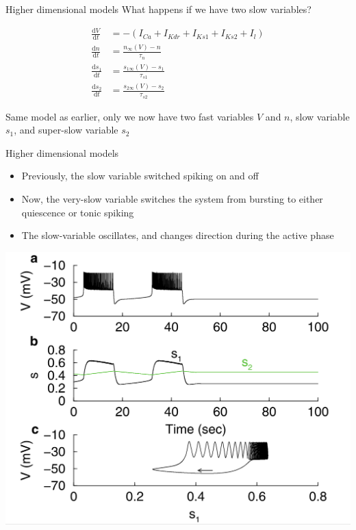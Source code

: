 \documentclass[presentation]{beamer}
\begin{document}
\begin{frame}[label={sec:org3cc1abf}]{Higher dimensional models}
What happens if we have two slow variables?

\begin{align}
\frac{\mathrm{d}V}{\mathrm{d}t} &= -(I_{Ca} + I_{Kdr} + I_{Ks1} + I_{Ks2} + I_l) \\ \nonumber
\frac{\mathrm{d}n}{\mathrm{d}t} &= \frac{n_\infty(V) - n}{\tau_n} \\ \nonumber
\frac{\mathrm{d}s_1}{\mathrm{d}t} &= \frac{s_{1\infty}(V) - s_1}{\tau_{s1}} \\ \nonumber
\frac{\mathrm{d}s_2}{\mathrm{d}t} &= \frac{s_{2\infty}(V) - s_2}{\tau_{s2}} \nonumber
\end{align}

Same model as earlier, only we now have two fast variables \(V\) and \(n\), slow variable \(s_1\), and super-slow variable \(s_2\)
\end{frame}

\begin{frame}[label={sec:org3bad4d3},plain]{Higher dimensional models}
\begin{itemize}
\item Previously, the slow variable switched spiking on and off
\item Now, the very-slow variable switches the system from bursting to either quiescence or tonic spiking
\item The slow-variable oscillates, and changes direction during the active phase
\end{itemize}


\begin{center}
\includegraphics[width=.74\textwidth]{./phantomts.png}
\end{center}
\end{frame}
\end{document}
